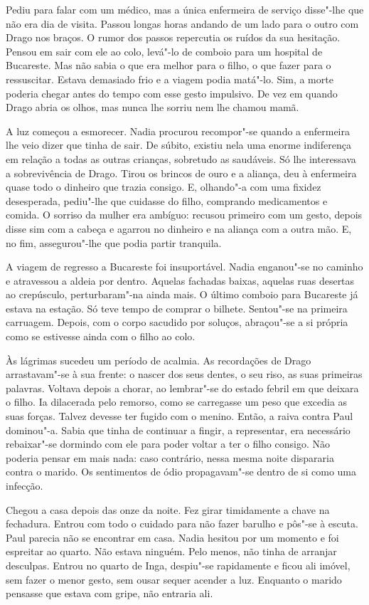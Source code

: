 Pediu para falar com um médico, mas a única enfermeira de serviço
disse"-lhe que não era dia de visita. Passou longas horas andando de um
lado para o outro com Drago nos braços. O rumor dos passos repercutia os
ruídos da sua hesitação. Pensou em sair com ele ao colo, levá"-lo de
comboio para um hospital de Bucareste. Mas não sabia o que era melhor
para o filho, o que fazer para o ressuscitar. Estava demasiado frio e a
viagem podia matá"-lo. Sim, a morte poderia chegar antes do tempo com
esse gesto impulsivo. De vez em quando Drago abria os olhos, mas nunca
lhe sorriu nem lhe chamou mamã.

A luz começou a esmorecer. Nadia procurou recompor"-se quando a enfermeira lhe veio dizer que tinha de sair. De súbito,
existiu nela uma enorme indiferença em relação a todas as outras
crianças, sobretudo as saudáveis. Só
lhe interessava a sobrevivência de Drago. Tirou os brincos de ouro e a
aliança, deu à enfermeira quase todo o dinheiro que trazia consigo. E,
olhando"-a com uma fixidez desesperada, pediu"-lhe que cuidasse do
filho, comprando medicamentos e comida. O sorriso da mulher era
ambíguo: recusou primeiro com um gesto, depois disse sim com a cabeça e
agarrou no dinheiro e na aliança com a outra mão. E, no fim,
assegurou"-lhe que podia partir tranquila.

A viagem de regresso a Bucareste foi insuportável. Nadia enganou"-se no
caminho e atravessou a aldeia por dentro. Aquelas fachadas baixas,
aquelas ruas desertas ao crepúsculo, perturbaram"-na ainda mais. O último
comboio para Bucareste já estava na estação. Só teve tempo de comprar
o bilhete. Sentou"-se na primeira carruagem. Depois, com o corpo sacudido
por soluços, abraçou"-se a si própria como se estivesse ainda com o filho
ao colo.

Às lágrimas sucedeu um período de acalmia. As recordações de Drago
arrastavam"-se à sua frente: o nascer dos seus dentes, o seu riso, as
suas primeiras palavras. Voltava depois a chorar, ao lembrar"-se do
estado febril em que deixara o filho. Ia dilacerada pelo remorso, como
se carregasse um peso que excedia as suas forças. Talvez devesse ter
fugido com o menino. Então, a raiva contra Paul dominou"-a. Sabia que
tinha de continuar a fingir, a representar, era necessário rebaixar"-se
dormindo com ele para poder voltar a ter o filho consigo. Não poderia
pensar em mais nada: caso contrário, nessa mesma noite dispararia contra
o marido. Os sentimentos de ódio propagavam"-se dentro de si como uma
infecção.

Chegou a casa depois das onze da noite. Fez girar timidamente a chave
na fechadura. Entrou com todo o cuidado para não fazer barulho e pôs"-se
à escuta. Paul parecia não se encontrar em casa. Nadia hesitou por um
momento e foi espreitar ao quarto. Não estava ninguém. Pelo menos, não
tinha de arranjar desculpas. Entrou no quarto de Inga, despiu"-se
rapidamente e ficou ali imóvel, sem fazer o menor gesto, sem ousar
sequer acender a luz. Enquanto o marido pensasse que estava com gripe,
não entraria ali.

